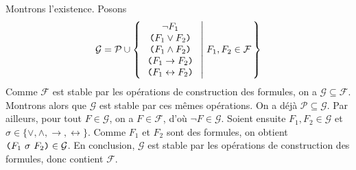 \documentclass[./main]{subfiles}
\begin{document}
  \begin{prv}
    Montrons l'existence. 
    Posons \[\mathcal{G} = \mathcal{P} \cup \mleft\{\, 
          \begin{array}{c}
            \lnot F_1\\
            \verb|(| F_1 \lor F_2 \verb|)|\\
            \verb|(| F_1 \land F_2 \verb|)|\\
            \verb|(| F_1 \to F_2 \verb|)|\\
            \verb|(| F_1 \leftrightarrow F_2 \verb|)|
          \end{array}
        \;\middle|\; F_1, F_2 \in \mathcal{F} \,\mright\}\]
    Comme $\mathcal{F}$ est stable par les opérations de construction des formules, on a $\mathcal{G} \subseteq \mathcal{F}$.
    Montrons alors que $\mathcal{G}$ est stable par ces mêmes opérations. On a déjà $\mathcal{P} \subseteq \mathcal{G}$.
    Par ailleurs, pour tout $F \in \mathcal{G}$, on a $F \in \mathcal{F}$, d'où $\lnot F \in \mathcal{G}$.
    Soient ensuite $F_1, F_2 \in \mathcal{G}$ et $\sigma \in \{\lor, \land, \to, \leftrightarrow\}$.
    Comme $F_1$ et $F_2$ sont des formules, on obtient $\verb|(| F_1\ \sigma\ F_2 \verb|)| \in \mathcal{G}$.
    En conclusion, $\mathcal{G}$ est stable par les opérations de construction des formules, donc contient $\mathcal{F}$.
    

\end{prv}
\end{document}
